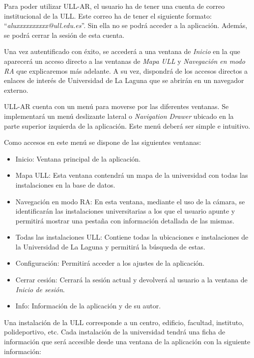Para poder utilizar ULL-AR, el usuario ha de tener una cuenta de correo institucional de la ULL. Este correo ha de tener el siguiente formato: ``\textit{aluxxxxxxxxxx@ull.edu.es}''. Sin ella no se podrá acceder a la aplicación. Además, se podrá cerrar la sesión de esta cuenta.

Una vez autentificado con éxito, se accederá a una ventana de \textit{Inicio} en la que aparecerá un acceso directo a las ventanas de \textit{Mapa ULL} y \textit{Navegación en modo RA} que explicaremos más adelante. A su vez, dispondrá de los accesos directos a enlaces de interés de Universidad de La Laguna que se abrirán en un navegador externo. 

ULL-AR cuenta con un menú para moverse por las diferentes ventanas. Se implementará un menú deslizante lateral o \textit{Navigation Drawer} \cite{URL::NavigationDraw} ubicado en la parte superior izquierda de la aplicación. Este menú deberá ser simple e intuitivo.

Como accesos en este menú se dispone de las siguientes ventanas:

\begin{itemize}
    \item Inicio: Ventana principal de la aplicación.
    \item Mapa ULL: Esta ventana contendrá un mapa de la universidad con todas las instalaciones en la base de datos. 
    \item Navegación en modo RA: En esta ventana, mediante el uso de la cámara, se identificarán las instalaciones universitarias a los que el usuario apunte y permitirá mostrar una pestaña con información detallada de las mismas.
    \item Todas las instalaciones ULL: Contiene todas la ubicaciones e instalaciones de la Universidad de La Laguna y permitirá la búsqueda de estas. 
    \item Configuración: Permitirá acceder a los ajustes de la aplicación.
    \item Cerrar cesión: Cerrará la sesión actual y devolverá al usuario a la ventana de \textit{Inicio de sesión}.
    \item Info: Información de la aplicación y de su autor.
\end{itemize}

Una instalación de la ULL corresponde a un centro, edificio, facultad, instituto, polideportivo, etc. Cada instalación de la universidad tendrá una ficha de información que será accesible desde una ventana de la aplicación con la siguiente información:

